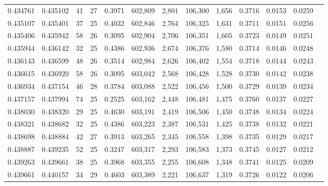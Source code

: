 \begin{tabular}{rrrrrrrrrrrrr}
0.434761 & 0.435102 &    41 &  27 &                                     0.3971 & 602,809 &   2,801 & 106,300 &   1,656 & 0.3716 & 0.0153 & 0.0259 \\
0.435107 & 0.435401 &    37 &  25 &                                     0.4032 & 602,846 &   2,764 & 106,325 &   1,631 & 0.3711 & 0.0151 & 0.0256 \\
0.435406 & 0.435942 &    58 &  26 &                                     0.3095 & 602,904 &   2,706 & 106,351 &   1,605 & 0.3723 & 0.0149 & 0.0251 \\
0.435944 & 0.436142 &    32 &  25 &                                     0.4386 & 602,936 &   2,674 & 106,376 &   1,580 & 0.3714 & 0.0146 & 0.0248 \\
0.436143 & 0.436599 &    48 &  26 &                                     0.3514 & 602,984 &   2,626 & 106,402 &   1,554 & 0.3718 & 0.0144 & 0.0243 \\
0.436615 & 0.436920 &    58 &  26 &                                     0.3095 & 603,042 &   2,568 & 106,428 &   1,528 & 0.3730 & 0.0142 & 0.0238 \\
0.436934 & 0.437154 &    46 &  28 &                                     0.3784 & 603,088 &   2,522 & 106,456 &   1,500 & 0.3729 & 0.0139 & 0.0234 \\
0.437157 & 0.437994 &    74 &  25 &                                     0.2525 & 603,162 &   2,448 & 106,481 &   1,475 & 0.3760 & 0.0137 & 0.0227 \\
0.438030 & 0.438320 &    29 &  25 &                                     0.4630 & 603,191 &   2,419 & 106,506 &   1,450 & 0.3748 & 0.0134 & 0.0224 \\
0.438321 & 0.438682 &    32 &  25 &                                     0.4386 & 603,223 &   2,387 & 106,531 &   1,425 & 0.3738 & 0.0132 & 0.0221 \\
0.438698 & 0.438884 &    42 &  27 &                                     0.3913 & 603,265 &   2,345 & 106,558 &   1,398 & 0.3735 & 0.0129 & 0.0217 \\
0.438887 & 0.439235 &    52 &  25 &                                     0.3247 & 603,317 &   2,293 & 106,583 &   1,373 & 0.3745 & 0.0127 & 0.0212 \\
0.439263 & 0.439661 &    38 &  25 &                                     0.3968 & 603,355 &   2,255 & 106,608 &   1,348 & 0.3741 & 0.0125 & 0.0209 \\
0.439661 & 0.440157 &    34 &  29 &                                     0.4603 & 603,389 &   2,221 & 106,637 &   1,319 & 0.3726 & 0.0122 & 0.0206 \\

\end{tabular}

